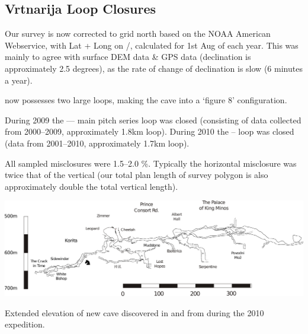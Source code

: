 \subsection{Vrtnarija Loop Closures}

Our survey is now corrected to grid north based on the NOAA American
Webservice, with Lat + Long on /, calculated for 1st Aug of each year.
This was mainly to agree with surface DEM data \& GPS data (declination is
approximately 2.5 degrees), as the rate of change of declination is slow (6
minutes a year).

 now possesses two large loops, making the cave into a `figure 8' configuration. 

During 2009 the  --- main pitch series loop was closed
(consisting of data collected from 2000--2009, approximately 1.8km loop).
During 2010 the  --  loop was closed (data from
2001--2010, approximately 1.7km loop).

All sampled misclosures were 1.5--2.0 \%. Typically the horizontal misclosure
was twice that of the vertical (our total plan length of survey polygon is also
approximately double the total vertical length).


\begin{pagesurvey}
\centering
\includegraphics[width=\textheight, angle=90]{2010/expo_findings/2010_new_stuff_extended_extraction.pdf}
\caption[2010 Discoveries Extended Elevation]{Extended elevation of new cave discovered in \protect{} and from \protect{} during the 2010 expedition.}
\end{pagesurvey}


